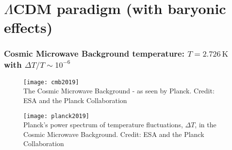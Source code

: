 \section{$\Lambda$CDM paradigm (with baryonic effects)}



\begin{frame}
  \frametitle{Cosmic Microwave Background temperature: $T=2.726\,\text{K}$  with $\Delta T/T\sim 10^{-6}$}
  \begin{figure}
    \centering
    \texttt{[image: cmb2019]}\\
     \tiny{The Cosmic Microwave Background - as seen by Planck. Credit: ESA and the Planck Collaboration}
  \end{figure}

  
\end{frame}


\begin{frame}
      \begin{figure}
    \centering
    \texttt{[image: planck2019]}\\
     \tiny{Planck's power spectrum of temperature fluctuations, $\Delta T$, in the Cosmic Microwave Background. Credit: ESA and the Planck Collaboration}
  \end{figure}

  
\end{frame}



